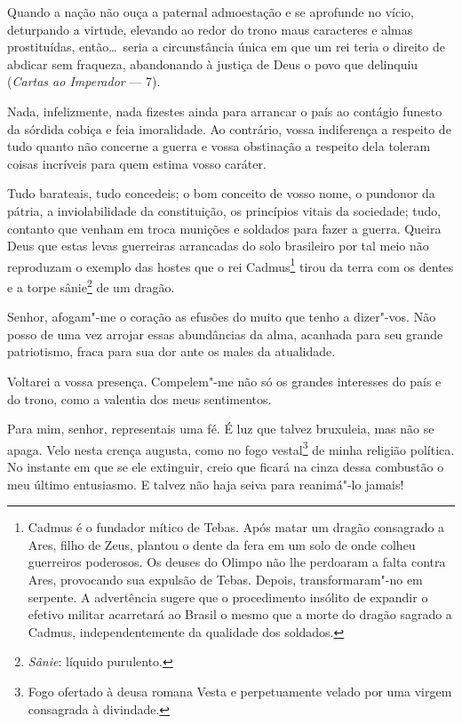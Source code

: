 \begin{hedraquote}
Quando a nação não ouça a paternal admoestação e se aprofunde no vício,
deturpando a virtude, elevando ao redor do trono maus caracteres e
almas prostituídas, então\ldots\ seria a circunstância única em que um rei
teria o direito de abdicar sem fraqueza, abandonando à justiça de Deus
o povo que delinquiu (\textit{Cartas ao Imperador} --- 7\ai). 
\end{hedraquote}

Nada, infelizmente, nada fizestes ainda para arrancar o país ao contágio
funesto da sórdida cobiça e feia imoralidade. Ao contrário, vossa
indiferença a respeito de tudo quanto não concerne a guerra e vossa
obstinação a respeito dela toleram coisas incríveis para quem estima vosso caráter.

Tudo barateais, tudo concedeis; o bom conceito de vosso nome, o pundonor
da pátria, a inviolabilidade da constituição, os princípios vitais da
sociedade; tudo, contanto que venham em troca munições e soldados para
fazer a guerra. Queira Deus que estas levas guerreiras arrancadas do
solo brasileiro por tal meio não reproduzam o exemplo das hostes que o
rei Cadmus\footnote{ Cadmus é o fundador mítico de Tebas. Após matar um dragão consagrado a
Ares, filho de Zeus, plantou o dente da fera em um solo de onde colheu
guerreiros poderosos. Os deuses do Olimpo não lhe perdoaram a falta
contra Ares, provocando sua expulsão de Tebas. Depois, 
transformaram"-no em serpente. A advertência sugere que o procedimento
insólito de expandir o efetivo militar acarretará ao Brasil o mesmo que
a morte do dragão sagrado a Cadmus, independentemente da qualidade dos
soldados.} tirou da terra com os dentes e a torpe
sânie\footnote{ \textit{Sânie}: líquido purulento.} de um dragão.  

\sectionitem

Senhor, afogam"-me o coração as efusões do muito que tenho a
dizer"-vos. Não posso de uma vez arrojar essas abundâncias da alma,
acanhada para seu grande patriotismo, fraca para sua dor ante os males da atualidade.

Voltarei a vossa presença. Compelem"-me não só os grandes interesses do
país e do trono, como a valentia dos meus sentimentos.

Para mim, senhor, representais uma fé. É luz que talvez bruxuleia, mas
não se apaga. Velo nesta crença augusta, como no fogo
vestal\footnote{ Fogo ofertado à deusa romana Vesta e
perpetuamente velado por uma virgem consagrada à divindade.} 
de minha religião política. No instante em que se ele extinguir, creio
que ficará na cinza dessa combustão o meu último entusiasmo. E talvez
não haja seiva para reanimá"-lo jamais! 

